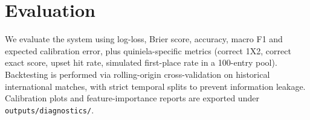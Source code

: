 \section{Evaluation}
We evaluate the system using log-loss, Brier score, accuracy, macro F1 and
expected calibration error, plus quiniela-specific metrics (correct 1X2,
correct exact score, upset hit rate, simulated first-place rate in a 100-entry
pool). Backtesting is performed via rolling-origin cross-validation on
historical international matches, with strict temporal splits to prevent
information leakage. Calibration plots and feature-importance reports are
exported under \texttt{outputs/diagnostics/}.
